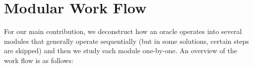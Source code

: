 


\section{Modular Work Flow} \label{overview_workflow}

For our main contribution, we deconstruct how an oracle operates into several modules that generally operate sequentially (but in some solutions, certain steps are skipped) and then we study each module one-by-one. An overview of the work flow is as follows:


